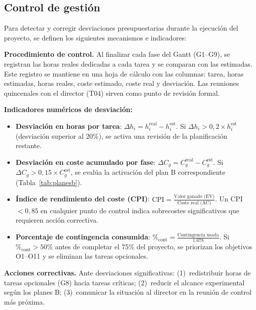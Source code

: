 \documentclass[11pt, a4paper]{article}
\begin{document}
\subsection{Control de gestión}
\label{sec:control}

Para detectar y corregir desviaciones presupuestarias durante la ejecución del proyecto, se definen los siguientes mecanismos e indicadores:

\textbf{Procedimiento de control.} Al finalizar cada fase del Gantt (G1--G9), se registran las horas reales dedicadas a cada tarea y se comparan con las estimadas. Este registro se mantiene en una hoja de cálculo con las columnas: tarea, horas estimadas, horas reales, coste estimado, coste real y desviación. Las reuniones quincenales con el director (T04) sirven como punto de revisión formal.

\textbf{Indicadores numéricos de desviación:}

\begin{itemize}[nosep, leftmargin=1.2em]
    \item \textbf{Desviación en horas por tarea}: $\Delta h_i = h_i^{\text{real}} - h_i^{\text{est}}$. Si $\Delta h_i > 0{,}2 \times h_i^{\text{est}}$ (desviación superior al 20\%), se activa una revisión de la planificación restante.
    \item \textbf{Desviación en coste acumulado por fase}: $\Delta C_g = C_g^{\text{real}} - C_g^{\text{est}}$. Si $\Delta C_g > 0{,}15 \times C_g^{\text{est}}$, se evalúa la activación del plan B correspondiente (Tabla~\ref{tab:planesb}).
    \item \textbf{Índice de rendimiento del coste (CPI)}: $\text{CPI} = \frac{\text{Valor ganado (EV)}}{\text{Coste real (AC)}}$. Un CPI $< 0{,}85$ en cualquier punto de control indica sobrecostes significativos que requieren acción correctiva.
    \item \textbf{Porcentaje de contingencia consumida}: $\%_{\text{cont}} = \frac{\text{Contingencia usada}}{1.678}$. Si $\%_{\text{cont}} > 50\%$ antes de completar el 75\% del proyecto, se priorizan los objetivos O1--O11 y se eliminan las tareas opcionales.
\end{itemize}

\textbf{Acciones correctivas.} Ante desviaciones significativas: (1)~redistribuir horas de tareas opcionales (G8) hacia tareas críticas; (2)~reducir el alcance experimental según los planes B; (3)~comunicar la situación al director en la reunión de control más próxima.

\end{document}
